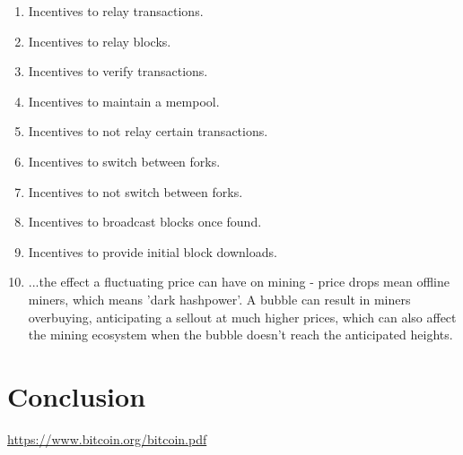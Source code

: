 \documentclass[letterpaper]{article}
\begin{document}
\begin{enumerate}
\item Incentives to relay transactions.

\item Incentives to relay blocks.

\item Incentives to verify transactions.

\item Incentives to maintain a mempool.

\item Incentives to not relay certain transactions.

\item Incentives to switch between forks.

\item Incentives to not switch between forks.

\item Incentives to broadcast blocks once found.

\item Incentives to provide initial block downloads.

\item ...the effect a fluctuating price can have on mining - price drops mean offline miners, which means 'dark hashpower'. A bubble can result in miners overbuying, anticipating a sellout at much higher prices, which can also affect the mining ecosystem when the bubble doesn't reach the anticipated heights.

\end{enumerate}

\section{Conclusion}

\begin{thebibliography}{9}
 \url{https://www.bitcoin.org/bitcoin.pdf}
\end{thebibliography}
\end{document}
